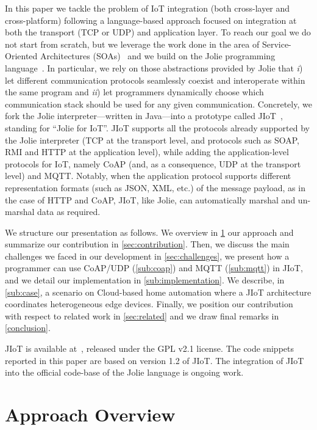 In this paper we tackle the problem of IoT integration (both cross-layer and
cross-platform) following a language-based approach focused on integration at
both the transport (TCP or UDP) and application layer. To reach our goal we do
not start from scratch, but we leverage the work done in the area of
Service-Oriented Architectures (SOAs)~\cite{Erl07} and we build on the Jolie
programming language~\cite{MONTESI200719,MGZ07,MontesiGZ14,jolie-lang}. In
particular, we rely on those abstractions provided by Jolie that \emph{i}) let
different communication protocols seamlessly coexist and interoperate within
the same program and \emph{ii}) let programmers dynamically choose which
communication stack should be used for any given communication.
%
Concretely, we fork the Jolie interpreter---written in Java---into a prototype
called JIoT~\cite{jiot}, standing for ``Jolie for IoT''.
%
JIoT supports all the protocols already supported by the Jolie interpreter (TCP at the transport level, and protocols such as SOAP, RMI and HTTP at the application level), while adding the application-level protocols for IoT, namely CoAP (and, as a consequence, UDP at the transport level) and MQTT.
Notably, when the application protocol supports different
representation formats (such as JSON, XML, etc.) of the message payload, as in
the case of HTTP and CoAP, JIoT, like Jolie, can automatically marshal and un-marshal data
as required.

We structure our presentation as follows. We overview in \cref{sec:approach}
our approach and summarize our contribution in \cref{sec:contribution}. Then,
we discuss the main challenges we faced in our development in
\cref{sec:challenges}, we present how a programmer can use CoAP/UDP
(\cref{sub:coap}) and MQTT (\cref{sub:mqtt}) in JIoT, and we detail our
implementation in \cref{sub:implementation}. We describe, in \cref{sub:case},
a scenario on Cloud-based home automation where a JIoT architecture
coordinates heterogeneous edge devices. Finally, we position our contribution
with respect to related work in \cref{sec:related} and we draw final remarks
in \cref{conclusion}.

JIoT is available at~\cite{jiot}, released under the GPL v2.1 license. The
code snippets reported in this paper are based on version 1.2 of JIoT. The
integration of JIoT into the official code-base of the Jolie language is
ongoing work.

\section{Approach Overview}
\label{sec:approach}

